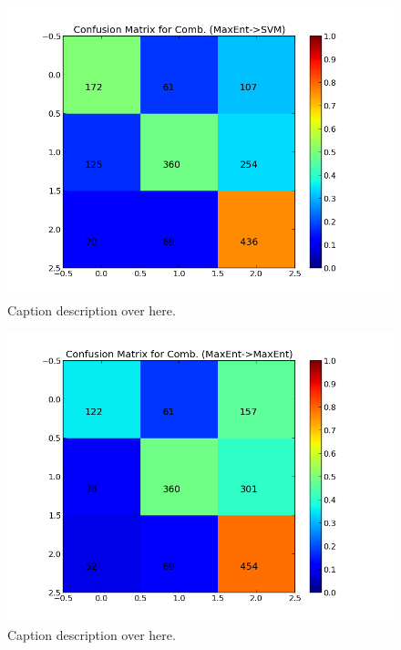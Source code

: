 \begin{minipage}[c]{\linewidth}
     \begin{minipage}{0.45\linewidth}
          \begin{figure}[H]
               \includegraphics[width=\linewidth]{../img/plots/grid/confusion_matrix_Comb-MaxEnt-SVM.png}
           \caption[Results overview across models]{Caption description over here.}
           \label{fig:confmat_maxent_svm}
          \end{figure}
     \end{minipage}
     \hspace{0.05\linewidth}
     \begin{minipage}{0.45\linewidth}
          \begin{figure}[H]
               \includegraphics[width=\linewidth]{../img/plots/grid/confusion_matrix_Comb-MaxEnt-MaxEnt.png}
           \caption[Results overview across models]{Caption description over here.}
           \label{fig:confmat_maxent_maxent}
          \end{figure}
     \end{minipage}
\end{minipage}

